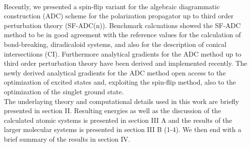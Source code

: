 \documentclass[aip,graphicx,amsmath,reprint]{revtex4-1}
\begin{document}
\\
Recently, we presented a spin-flip variant for the algebraic diagrammatic construction (ADC) scheme for the polarization propagator up to third order perturbation theory (SF-ADC(n)).\cite{Lefrancois2015} Benchmark calcuations showed the SF-ADC method to be in good agreement with the reference values for the calculation of bond-breaking, diradicaloid systems, and also for the description of conical intersectiions (CI).\cite{Lefrancois2015} Furthermore analytical gradients for the ADC method up to third order perturbation theory have been derived and implemented recently. \cite{Rehn2015} The newly derived analytical gradients for the ADC method open access to the optimization of excited states and, exploiting the spin-flip method, also to the optimization of the singlet ground state.
\\
The underlaying theory and computational details used in this work are briefly presented in section II. Resulting energies as well as the discussion of the calculated atomic systems is presented in section III A and the results of the larger molecular systems is presented in section III B (1-4). We then end with a brief summary of the results in section IV.
\end{document}
